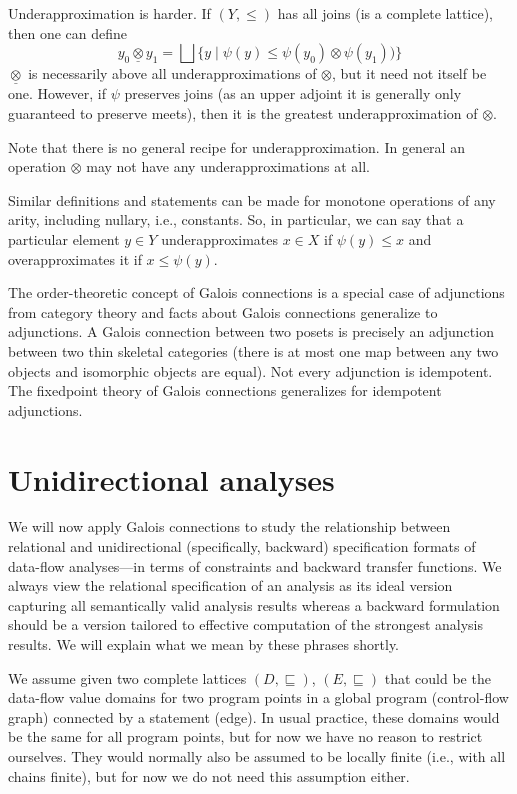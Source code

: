 \documentclass{llncs}
\newcommand{\bigjoin}{\bigsqcup}
\newcommand{\sqleq}{\sqsubseteq}
\begin{document}
Underapproximation is harder. If $(Y, \leq)$ has all joins (is a
complete lattice), then one can define
\[
y_0 \mathbin{\underline{\otimes}} y_1 = \bigjoin \{ y \mid \psi(y) \leq \psi(y_0) \otimes \psi(y_1))\} 
\]
$\underline{\otimes}$ is necessarily above all underapproximations of
$\otimes$, but it need not itself be one. However, if $\psi$ preserves
joins (as an upper adjoint it is generally only guaranteed to preserve
meets), then it is the greatest underapproximation of $\otimes$.

Note that there is no general recipe for underapproximation. In
general an operation $\otimes$ may not have any underapproximations at
all.

Similar definitions and statements can be made for monotone operations
of any arity, including nullary, i.e., constants.  So, in particular,
we can say that a particular element $y \in Y$ underapproximates
$x \in X$ if $\psi(y) \leq x$ and overapproximates it if
$x \leq \psi(y)$.

The order-theoretic concept of Galois connections is a special case of
adjunctions from category theory and facts about Galois connections
generalize to adjunctions. A Galois connection between two posets is
precisely an adjunction between two thin skeletal categories (there is
at most one map between any two objects and isomorphic objects are
equal). Not every adjunction is idempotent. The fixedpoint theory of
Galois connections generalizes for idempotent adjunctions.


\section{Unidirectional analyses}

We will now apply Galois connections to study the relationship between
relational and unidirectional (specifically, backward) specification
formats of data-flow analyses---in terms of constraints and backward
transfer functions. We always view the relational specification of an
analysis as its ideal version capturing all semantically valid
analysis results whereas a backward formulation should be a version
tailored to effective computation of the strongest analysis
results. We will explain what we mean by these phrases shortly.

We assume given two complete lattices $(D, \sqleq)$, $(E, \sqleq)$
that could be the data-flow value domains for two program points in a
global program (control-flow graph) connected by a statement
(edge). In usual practice, these domains would be the same for all
program points, but for now we have no reason to restrict
ourselves. They would normally also be assumed to be locally finite
(i.e., with all chains finite), but for now we do not need this
assumption either.
\end{document}
